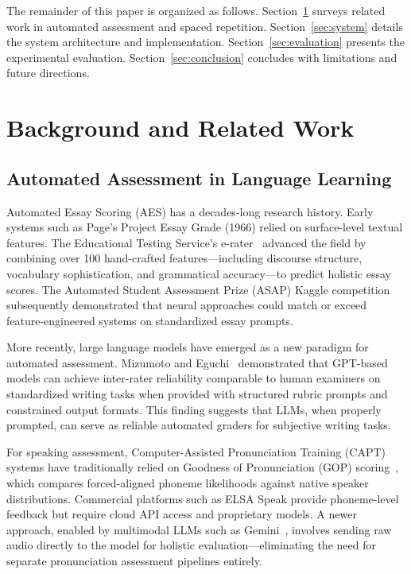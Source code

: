\documentclass[conference]{IEEEtran}
\begin{document}
The remainder of this paper is organized as follows. Section~\ref{sec:background} surveys related work in automated assessment and spaced repetition. Section~\ref{sec:system} details the system architecture and implementation. Section~\ref{sec:evaluation} presents the experimental evaluation. Section~\ref{sec:conclusion} concludes with limitations and future directions.

\section{Background and Related Work}
\label{sec:background}

\subsection{Automated Assessment in Language Learning}

Automated Essay Scoring (AES) has a decades-long research history. Early systems such as Page's Project Essay Grade (1966) relied on surface-level textual features. The Educational Testing Service's e-rater~\cite{erater} advanced the field by combining over 100 hand-crafted features---including discourse structure, vocabulary sophistication, and grammatical accuracy---to predict holistic essay scores. The Automated Student Assessment Prize (ASAP) Kaggle competition~\cite{asap} subsequently demonstrated that neural approaches could match or exceed feature-engineered systems on standardized essay prompts.

More recently, large language models have emerged as a new paradigm for automated assessment. Mizumoto and Eguchi~\cite{llm_aes} demonstrated that GPT-based models can achieve inter-rater reliability comparable to human examiners on standardized writing tasks when provided with structured rubric prompts and constrained output formats. This finding suggests that LLMs, when properly prompted, can serve as reliable automated graders for subjective writing tasks.

For speaking assessment, Computer-Assisted Pronunciation Training (CAPT) systems have traditionally relied on Goodness of Pronunciation (GOP) scoring~\cite{gop_scoring}, which compares forced-aligned phoneme likelihoods against native speaker distributions. Commercial platforms such as ELSA Speak provide phoneme-level feedback but require cloud API access and proprietary models. A newer approach, enabled by multimodal LLMs such as Gemini~\cite{gemini}, involves sending raw audio directly to the model for holistic evaluation---eliminating the need for separate pronunciation assessment pipelines entirely.
\end{document}
